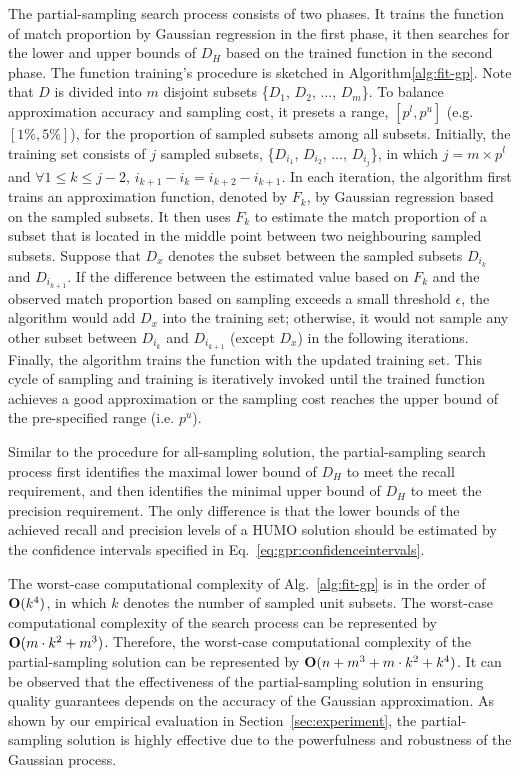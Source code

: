   The partial-sampling search process consists of two phases. It trains the function of match proportion by Gaussian regression in the first phase, it then searches for the lower and upper bounds of $D_H$ based on the trained function in the second phase. The function training's procedure is sketched in Algorithm\ref{alg:fit-gp}. Note that $D$ is divided into $m$ disjoint subsets \{$D_1$, $D_2$, $\ldots$, $D_m$\}. To balance approximation accuracy and sampling cost, it presets a range, $[p^l, p^u]$ (e.g. $[1\%, 5\%]$), for the proportion of sampled subsets among all subsets. Initially, the training set consists of $j$ sampled subsets, \{$D_{i_1}$, $D_{i_2}$, $\ldots$, $D_{i_j}$\}, in which $j=m\times p^l$ and $\forall 1\leq k\leq j-2$, $i_{k+1}-i_k=i_{k+2}-i_{k+1}$. In each iteration, the algorithm first trains an approximation function, denoted by $F_k$, by Gaussian regression based on the sampled subsets. It then uses $F_k$ to estimate the match proportion of a subset that is located in the middle point between two neighbouring sampled subsets. Suppose that $D_x$ denotes the subset between the sampled subsets $D_{i_k}$ and $D_{i_{k+1}}$. If the difference between the estimated value based on $F_k$ and the observed match proportion based on sampling exceeds a small threshold $\epsilon$, the algorithm would add $D_x$ into the training set; otherwise, it would not sample any other subset between $D_{i_k}$ and $D_{i_{k+1}}$ (except $D_x$) in the following iterations. Finally, the algorithm trains the function with the updated training set. This cycle of sampling and training is iteratively invoked until the trained function achieves a good approximation or the sampling cost reaches the upper bound of the pre-specified range (i.e. $p^u$).

  Similar to the procedure for all-sampling solution, the partial-sampling search process first identifies the maximal lower bound of $D_H$ to meet the recall requirement, and then identifies the minimal upper bound of $D_H$ to meet the precision requirement. The only difference is that the lower bounds of the achieved recall and precision levels of a HUMO solution should be estimated by the confidence intervals specified in Eq.~\ref{eq:gpr:confidenceintervals}.

  The worst-case computational complexity of Alg.~\ref{alg:fit-gp} is in the order of ${\bf O}(k^4)$, in which $k$ denotes the number of sampled unit subsets. The worst-case computational complexity of the search process can be represented by ${\bf O}(m\cdot k^2+m^3)$. Therefore, the worst-case computational complexity of the partial-sampling solution can be represented by ${\bf O}(n+m^3+m\cdot k^2+k^4)$. It can be observed that the effectiveness of the partial-sampling solution in ensuring quality guarantees depends on the accuracy of the Gaussian approximation. As shown by our empirical evaluation in Section~\ref{sec:experiment}, the partial-sampling solution is highly effective due to the powerfulness and robustness of the Gaussian process.
